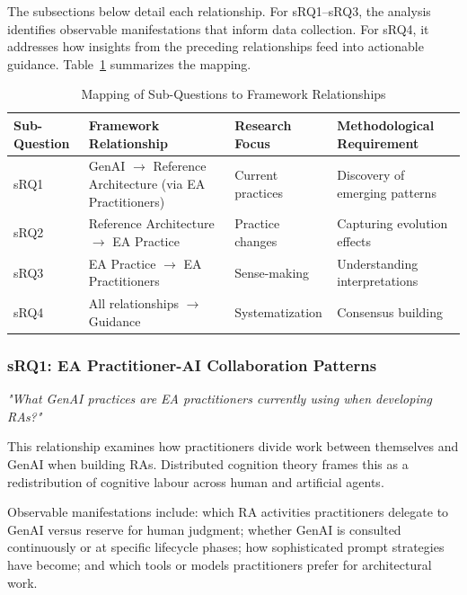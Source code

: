 The subsections below detail each relationship. For sRQ1--sRQ3, the analysis
identifies observable manifestations that inform data collection. For sRQ4, it
addresses how insights from the preceding relationships feed into actionable
guidance. Table~\ref{tab:framework-mapping} summarizes the mapping.

\begin{table}[htbp]
    \centering
    \caption{Mapping of Sub-Questions to Framework Relationships}
    \label{tab:framework-mapping}
    \begin{tabular}{|p{2cm}|p{4cm}|p{3.5cm}|p{4cm}|}
        \hline
        \textbf{Sub-Question} & \textbf{Framework Relationship} & \textbf{Research Focus} & \textbf{Methodological Requirement} \\
        \hline
        sRQ1 & GenAI $\rightarrow$ Reference Architecture (via EA Practitioners) & Current practices & Discovery of emerging patterns \\
        \hline
        sRQ2 & Reference Architecture $\rightarrow$ EA Practice & Practice changes & Capturing evolution effects \\
        \hline
        sRQ3 & EA Practice $\rightarrow$ EA Practitioners & Sense-making & Understanding interpretations \\
        \hline
        sRQ4 & All relationships $\rightarrow$ Guidance & Systematization & Consensus building \\
        \hline
    \end{tabular}
\end{table}

\subsubsection{sRQ1: EA Practitioner-AI Collaboration Patterns}

\textit{"What GenAI practices are EA practitioners currently using when developing RAs?"}
\vspace{0.5em}

This relationship examines how practitioners divide work between themselves and
GenAI when building RAs. Distributed cognition theory
\parencite{hutchins_cognition_1995} frames this as a redistribution of
cognitive labour across human and artificial agents.

Observable manifestations include: which RA activities practitioners delegate to
GenAI versus reserve for human judgment; whether GenAI is consulted continuously
or at specific lifecycle phases; how sophisticated prompt strategies have
become; and which tools or models practitioners prefer for architectural work.

